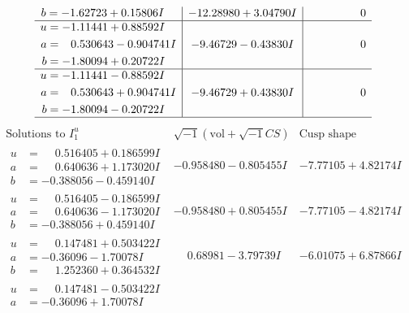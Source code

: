 \documentclass[1p]{elsarticle_modified}
\theoremstyle{definition}
\newcommand{\I}{\sqrt{-1}}
\begin{document}
$$\begin{array}{c|c|c}
\begin{aligned}
b &= -1.62723 + 0.15806 I\end{aligned}
 & -12.28980 + 3.04790 I & \phantom{-0.000000 } 0 \\ \hline\begin{aligned}
u &= -1.11441 + 0.88592 I \\
a &= \phantom{-}0.530643 - 0.904741 I \\
b &= -1.80094 + 0.20722 I\end{aligned}
 & -9.46729 - 0.43830 I & \phantom{-0.000000 } 0 \\ \hline\begin{aligned}
u &= -1.11441 - 0.88592 I \\
a &= \phantom{-}0.530643 + 0.904741 I \\
b &= -1.80094 - 0.20722 I\end{aligned}
 & -9.46729 + 0.43830 I & \phantom{-0.000000 } 0\\
 \hline 
 \end{array}$$\newpage$$\begin{array}{c|c|c}  
\text{Solutions to }I^u_{1}& \I (\text{vol} + \sqrt{-1}CS) & \text{Cusp shape}\\
 \hline 
\begin{aligned}
u &= \phantom{-}0.516405 + 0.186599 I \\
a &= \phantom{-}0.640636 + 1.173020 I \\
b &= -0.388056 - 0.459140 I\end{aligned}
 & -0.958480 - 0.805455 I & -7.77105 + 4.82174 I \\ \hline\begin{aligned}
u &= \phantom{-}0.516405 - 0.186599 I \\
a &= \phantom{-}0.640636 - 1.173020 I \\
b &= -0.388056 + 0.459140 I\end{aligned}
 & -0.958480 + 0.805455 I & -7.77105 - 4.82174 I \\ \hline\begin{aligned}
u &= \phantom{-}0.147481 + 0.503422 I \\
a &= -0.36096 - 1.70078 I \\
b &= \phantom{-}1.252360 + 0.364532 I\end{aligned}
 & \phantom{-}0.68981 - 3.79739 I & -6.01075 + 6.87866 I \\ \hline\begin{aligned}
u &= \phantom{-}0.147481 - 0.503422 I \\
a &= -0.36096 + 1.70078 I \\

\end{aligned}
\end{array}$$
\end{document}
